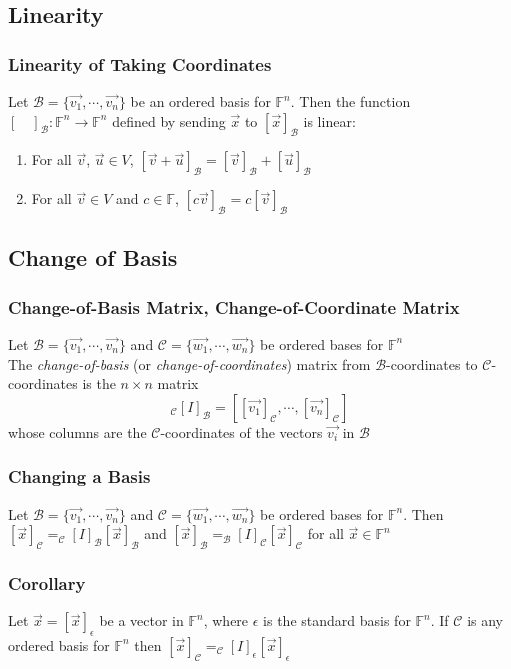 \documentclass[12pt, letterpaper]{article}
\begin{document}
\subsection{Linearity}
\subsubsection{Linearity of Taking Coordinates}
Let $\mathcal{B}=\{\vec{v_1},\cdots,\vec{v_n}\}$ be an ordered basis for $\mathbb{F}^n$. Then the function 
$[\quad]_\mathcal{B}:\mathbb{F}^n\rightarrow\mathbb{F}^n$ defined by sending $\vec{x}$ to $[\vec{x}]_\mathcal{B}$ is linear: 
\begin{enumerate}
    \item For all $\vec{v}$, $\vec{u}\in V$, $[\vec{v}+\vec{u}]_\mathcal{B} = [\vec{v}]_\mathcal{B} + [\vec{u}]_\mathcal{B}$
    \item For all $\vec{v}\in V$ and $c\in\mathbb{F}$, $[c\vec{v}]_\mathcal{B} = c[\vec{v}]_\mathcal{B}$
\end{enumerate}
\subsection{Change of Basis}
\subsubsection{Change-of-Basis Matrix, Change-of-Coordinate Matrix}
Let $\mathcal{B}=\{\vec{v_1},\cdots,\vec{v_n}\}$ and $\mathcal{C}=\{\vec{w_1},\cdots,\vec{w_n}\}$ be ordered bases for $\mathbb{F}^n$ \\
The \textit{change-of-basis} (or \textit{change-of-coordinates}) matrix from $\mathcal{B}$-coordinates to $\mathcal{C}$-coordinates is the 
$n\times n$ matrix 
\[_\mathcal{C}[I]_\mathcal{B} = [[\vec{v_1}]_\mathcal{C},\cdots,[\vec{v_n}]_\mathcal{C}]\]
whose columns are the $\mathcal{C}$-coordinates of the vectors $\vec{v_i}$ in $\mathcal{B}$
\subsubsection{Changing a Basis}
Let $\mathcal{B}=\{\vec{v_1},\cdots,\vec{v_n}\}$ and $\mathcal{C}=\{\vec{w_1},\cdots,\vec{w_n}\}$ be ordered bases for $\mathbb{F}^n$. 
Then $[\vec{x}]_\mathcal{C} = _\mathcal{C}[I]_\mathcal{B}[\vec{x}]_\mathcal{B}$ and $[\vec{x}]_\mathcal{B} = _\mathcal{B}[I]_\mathcal{C}[\vec{x}]_\mathcal{C}$
for all $\vec{x}\in\mathbb{F}^n$
\subsubsection{Corollary}
Let $\vec{x} = [\vec{x}]_\epsilon$ be a vector in $\mathbb{F}^n$, where $\epsilon$ is the standard basis for $\mathbb{F}^n$. If $\mathcal{C}$ is any ordered basis 
for $\mathbb{F}^n$ then $[\vec{x}]_\mathcal{C} = _\mathcal{C}[I]_\epsilon[\vec{x}]_\epsilon$
\end{document}
